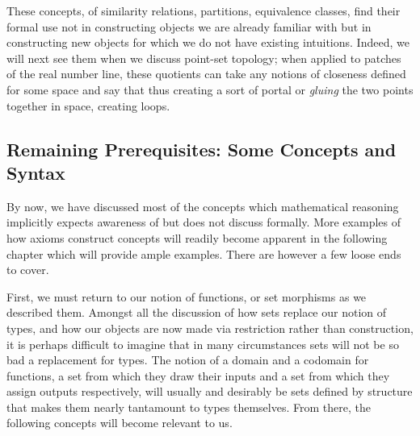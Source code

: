 \documentclass[11pt]{article}
\begin{document}
These concepts, of similarity relations, partitions, equivalence classes, find their formal use not in constructing objects we are already familiar with but in constructing new objects for which we do not have existing intuitions. Indeed, we will next see them when we discuss point-set topology; when applied to patches of the real number line, these quotients can take any notions of closeness defined for some space and say that  thus creating a sort of portal or \emph{gluing} the two points together in space, creating loops.

\subsection{Remaining Prerequisites: Some Concepts and Syntax}

By now, we have discussed most of the concepts which mathematical reasoning implicitly expects awareness of but does not discuss formally. More examples of how axioms construct concepts will readily become apparent in the following chapter which will provide ample examples. There are however a few loose ends to cover.

First, we must return to our notion of functions, or set morphisms as we described them. Amongst all the discussion of how sets replace our notion of types, and how our objects are now made via restriction rather than construction, it is perhaps difficult to imagine that in many circumstances sets will not be so bad a replacement for types. The notion of a domain and a codomain for functions, a set from which they draw their inputs and a set from which they assign outputs respectively, will usually and desirably be sets defined by structure that makes them nearly tantamount to types themselves. From there, the following concepts will become relevant to us.
\end{document}
